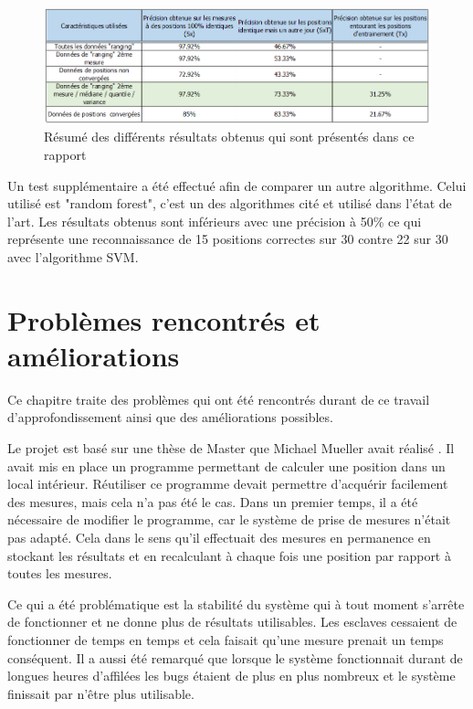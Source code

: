 \begin{figure}[htp]
 \begin{center}
  \includegraphics[scale=0.7]{figures/Resultats.png}
  \caption{Résumé des différents résultats obtenus qui sont présentés dans ce rapport}
  \label{fig:result} %
 \end{center}
\end{figure}

Un test supplémentaire a été effectué afin de comparer un autre algorithme. Celui utilisé est "random forest", c'est un des algorithmes cité et utilisé dans l'état de l'art. Les résultats obtenus sont inférieurs avec une précision à 50\% ce qui représente une reconnaissance de 15 positions correctes sur 30 contre 22 sur 30 avec l'algorithme SVM. 

\chapter{Problèmes rencontrés et améliorations}
Ce chapitre traite des problèmes qui ont été rencontrés durant de ce travail d'approfondissement ainsi que des améliorations possibles.

Le projet est basé sur une thèse de Master que Michael Mueller avait réalisé \cite{MIC}. Il avait mis en place un programme permettant de calculer une position dans un local intérieur. Réutiliser ce programme devait permettre d'acquérir facilement des mesures, mais cela n'a pas été le cas. Dans un premier temps, il a été nécessaire de modifier le programme, car le système de prise de mesures n'était pas adapté. Cela dans le sens qu'il effectuait des mesures en permanence en stockant les résultats et en recalculant à chaque fois une position par rapport à toutes les mesures. 

Ce qui a été problématique est la stabilité du système qui à tout moment s'arrête de fonctionner et ne donne plus de résultats utilisables. Les esclaves cessaient de fonctionner de temps en temps et cela faisait qu'une mesure prenait un temps conséquent. Il a aussi été remarqué que lorsque le système fonctionnait durant de longues heures d'affilées les bugs étaient de plus en plus nombreux et le système finissait par n'être plus utilisable. 

